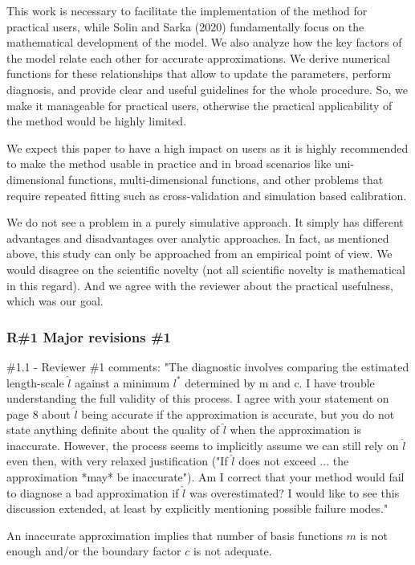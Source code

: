 \documentclass[11pt]{report}
\begin{document}
This work is necessary to facilitate the implementation of the method for practical users, while Solin and Sarka (2020) fundamentally focus on the mathematical development of the model. We also analyze how the key factors of the model relate each other for accurate approximations. We derive numerical functions for these relationships that allow to update the parameters, perform diagnosis, and provide clear and useful guidelines for the whole procedure. So, we make it manageable for practical users, otherwise the practical applicability of the method would be highly limited.

We expect this paper to have a high impact on users as it is highly recommended to make the method usable in practice and in broad scenarios like uni-dimensional functions, multi-dimensional functions, and other problems that require repeated fitting such as cross-validation and simulation based calibration.

We do not see a problem in a purely simulative approach. It simply has different advantages and disadvantages over analytic approaches. In fact, as mentioned above, this study can only be approached from an empirical point of view. We would disagree on the scientific novelty (not all scientific novelty is mathematical in this regard). And we agree with the reviewer about the practical usefulness, which was our goal.

\subsubsection*{R\#1 Major revisions \#1}

\#1.1 - Reviewer \#1 comments: "The diagnostic involves comparing the estimated length-scale $\hat l$ against a minimum $l^*$ determined by m and c. I have trouble understanding the full validity of this process. I agree with your statement on page 8 about $\hat l$ being accurate if the approximation is accurate, but you do not state anything definite about the quality of $\hat l$ when the approximation is inaccurate. However, the process seems to implicitly assume we can still rely on $\hat l$ even then, with very relaxed justification ("If $\hat l$ does not exceed ... the approximation *may* be inaccurate"). Am I correct that your method would fail to diagnose a bad approximation if $\hat l$ was overestimated? I would like to see this discussion extended, at least by explicitly mentioning possible failure modes." 

An inaccurate approximation implies that number of basis functions $m$ is not enough and/or the boundary factor $c$ is not adequate.
\end{document}

